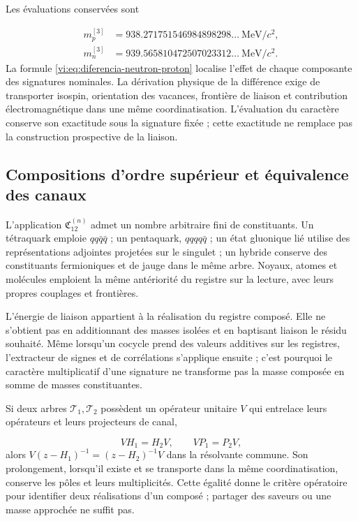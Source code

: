 Les évaluations conservées sont

\begin{align*}
 m_p^{[3]}&=938.271751546984898298\ldots\ \mathrm{MeV}/c^2,\\
 m_n^{[3]}&=939.565810472507023312\ldots\ \mathrm{MeV}/c^2.
\end{align*}
La formule \eqref{vi:eq:diferencia-neutron-proton} localise l’effet de
chaque composante des signatures nominales. La dérivation physique de la
différence exige de transporter isospin, orientation des vacances,
frontière de liaison et contribution électromagnétique dans une même coordinatisation.
L’évaluation du caractère conserve son exactitude sous la signature fixée ;
cette exactitude ne remplace pas la construction prospective de la liaison.


\subsection{Compositions d’ordre supérieur et équivalence des canaux
}
\label{vi:subsec:compuestos-superiores}

L’application \(\mathfrak C_{12}^{(n)}\) admet un nombre arbitraire
fini de constituants. Un tétraquark emploie \(qq\bar q\bar q\) ;
un pentaquark, \(qqqq\bar q\) ; un état gluonique lié utilise
des représentations adjointes projetées sur le singulet ; un hybride conserve
des constituants fermioniques et de jauge dans le même arbre. Noyaux,
atomes et molécules emploient la même antériorité du registre sur la lecture,
avec leurs propres couplages et frontières.


L’énergie de liaison appartient à la réalisation du registre composé.
Elle ne s’obtient pas en additionnant des masses isolées et en baptisant liaison le
résidu souhaité. Même lorsqu’un cocycle prend des valeurs additives sur
les registres, l’extracteur de signes et de corrélations s’applique ensuite ;
c’est pourquoi le caractère multiplicatif d’une signature ne transforme pas la masse
composée en somme de masses constituantes.


Si deux arbres \(\mathcal T_1,\mathcal T_2\) possèdent un opérateur unitaire
\(V\) qui entrelace leurs opérateurs et leurs projecteurs de canal,

\[
 VH_1=H_2V,\qquad VP_1=P_2V,
\]
alors \(V(z-H_1)^{-1}=(z-H_2)^{-1}V\) dans la résolvante commune.
Son prolongement, lorsqu’il existe et se transporte dans la même coordinatisation,
conserve les pôles et leurs multiplicités. Cette égalité donne le critère
opératoire pour identifier deux réalisations d’un composé ; partager
des saveurs ou une masse approchée ne suffit pas.


